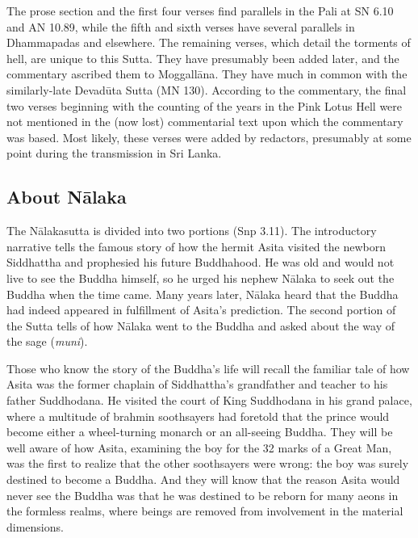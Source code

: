 \documentclass[12pt,openany]{book}%
\begin{document}
The prose section and the first four verses find parallels in the Pali at SN 6.10 and AN 10.89, while the fifth and sixth verses have several parallels in Dhammapadas and elsewhere. The remaining verses, which detail the torments of hell, are unique to this Sutta. They have presumably been added later, and the commentary ascribed them to \textsanskrit{Moggallāna}. They have much in common with the similarly-late \textsanskrit{Devadūta} Sutta (MN 130). According to the commentary, the final two verses beginning with the counting of the years in the Pink Lotus Hell were not mentioned in the (now lost) commentarial text upon which the commentary was based. Most likely, these verses were added by redactors, presumably at some point during the transmission in Sri Lanka.

\subsection*{About \textsanskrit{Nālaka}}

The \textsanskrit{Nālakasutta} is divided into two portions (Snp 3.11). The introductory narrative tells the famous story of how the hermit Asita visited the newborn Siddhattha and prophesied his future Buddhahood. He was old and would not live to see the Buddha himself, so he urged his nephew \textsanskrit{Nālaka} to seek out the Buddha when the time came. Many years later, \textsanskrit{Nālaka} heard that the Buddha had indeed appeared in fulfillment of Asita’s prediction. The second portion of the Sutta tells of how \textsanskrit{Nālaka} went to the Buddha and asked about the way of the sage (\textit{muni}).

Those who know the story of the Buddha’s life will recall the familiar tale of how Asita was the former chaplain of Siddhattha’s grandfather and teacher to his father Suddhodana. He visited the court of King Suddhodana in his grand palace, where a multitude of brahmin soothsayers had foretold that the prince would become either a wheel-turning monarch or an all-seeing Buddha. They will be well aware of how Asita, examining the boy for the 32 marks of a Great Man, was the first to realize that the other soothsayers were wrong: the boy was surely destined to become a Buddha. And they will know that the reason Asita would never see the Buddha was that he was destined to be reborn for many aeons in the formless realms, where beings are removed from involvement in the material dimensions.
\end{document}
